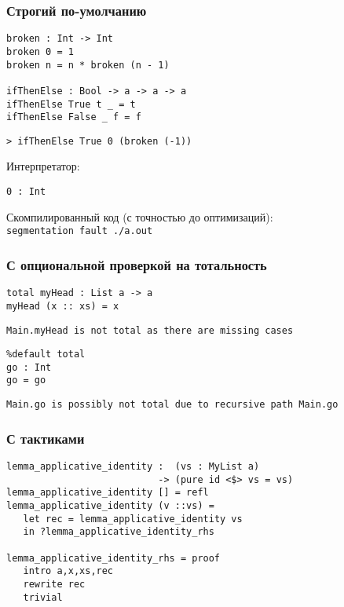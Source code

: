 \begin{frame}[fragile]
   \frametitle{Строгий по-умолчанию}
   \begin{lstlisting}
broken : Int -> Int
broken 0 = 1
broken n = n * broken (n - 1)

ifThenElse : Bool -> a -> a -> a
ifThenElse True t _ = t
ifThenElse False _ f = f
   \end{lstlisting}
   \begin{lstlisting}
> ifThenElse True 0 (broken (-1))
   \end{lstlisting}
   Интерпретатор:
   \begin{lstlisting}
0 : Int
   \end{lstlisting}
   Скомпилированный код (с точностью до оптимизаций):\\
   \texttt{segmentation fault ./a.out}
\end{frame}

\begin{frame}[fragile]
   \frametitle{С опциональной проверкой на тотальность}
   \begin{lstlisting}
total myHead : List a -> a
myHead (x :: xs) = x
   \end{lstlisting}
   \texttt{Main.myHead is not total as there are missing cases}
   \begin{lstlisting}
%default total
go : Int
go = go
   \end{lstlisting}
   \texttt{Main.go is possibly not total due to recursive path Main.go}
\end{frame}

\begin{frame}[fragile]
   \frametitle{С тактиками}
   \begin{lstlisting}
lemma_applicative_identity :  (vs : MyList a)
                           -> (pure id <$> vs = vs)
lemma_applicative_identity [] = refl
lemma_applicative_identity (v ::vs) =
   let rec = lemma_applicative_identity vs
   in ?lemma_applicative_identity_rhs

lemma_applicative_identity_rhs = proof
   intro a,x,xs,rec
   rewrite rec
   trivial
   \end{lstlisting}
\end{frame}

